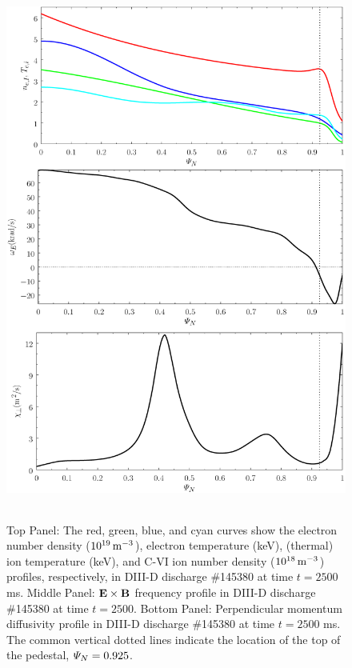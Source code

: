 \documentclass[12pt,prb,aps]{revtex4-1}
\begin{document}
\begin{figure}
\includegraphics[height=7in]{fig3.pdf}
\caption{Top Panel: The red, green, blue, and cyan curves show the electron number density ($10^{19}\,{\rm m}^{-3}$),
electron temperature (keV), (thermal) ion temperature (keV), and
 C-VI ion number density  ($10^{18}\,{\rm m}^{-3}$)  profiles, respectively,  in  DIII-D discharge \#145380 at time $t=2500$ ms. Middle Panel:  
 ${\bf E}\times {\bf B}$ frequency profile in  DIII-D discharge \#145380 at time $t=2500$. Bottom Panel: Perpendicular momentum diffusivity 
profile in  DIII-D discharge \#145380 at time $t=2500$ ms.
The   common vertical dotted lines indicate the location of the top
of the pedestal, ${\mit\Psi}_N=0.925$.} \label{fig3}
\end{figure}
\end{document}

